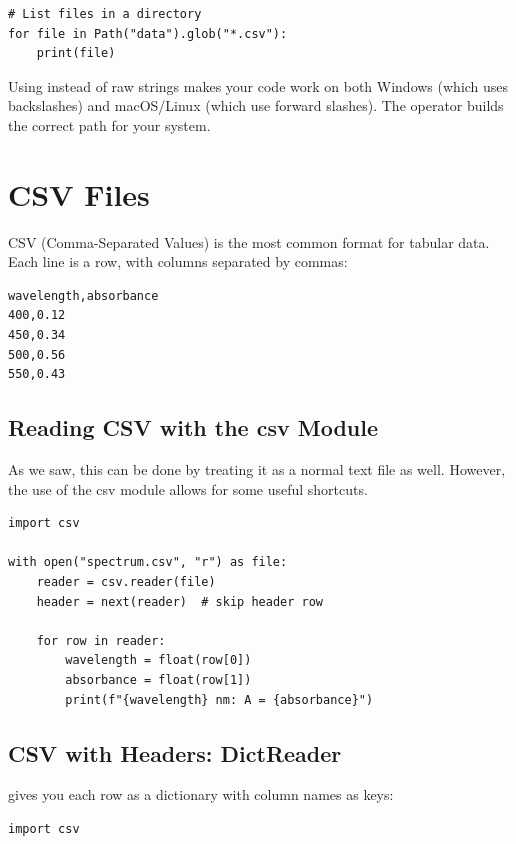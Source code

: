 \begin{labexample}
\begin{lstlisting}
# List files in a directory
for file in Path("data").glob("*.csv"):
    print(file)
\end{lstlisting}

\begin{tip}
Using  instead of raw strings makes your code work on both Windows (which uses backslashes) and macOS/Linux (which use forward slashes). The \py{/} operator builds the correct path for your system.
\end{tip}

\section{CSV Files}
\label{sec:csv}

CSV (Comma-Separated Values) is the most common format for tabular data. Each line is a row, with columns separated by commas:

\begin{lstlisting}[style=outputstyle]
wavelength,absorbance
400,0.12
450,0.34
500,0.56
550,0.43
\end{lstlisting}

\subsection{Reading CSV with the csv Module}

As we saw, this can be done by treating it as a normal text file as well. However, the use of the csv module allows for some useful shortcuts.

\begin{lstlisting}
import csv

with open("spectrum.csv", "r") as file:
    reader = csv.reader(file)
    header = next(reader)  # skip header row

    for row in reader:
        wavelength = float(row[0])
        absorbance = float(row[1])
        print(f"{wavelength} nm: A = {absorbance}")
\end{lstlisting}

\subsection{CSV with Headers: DictReader}

 gives you each row as a dictionary with column names as keys:

\begin{lstlisting}
import csv


\end{lstlisting}
\end{labexample}
